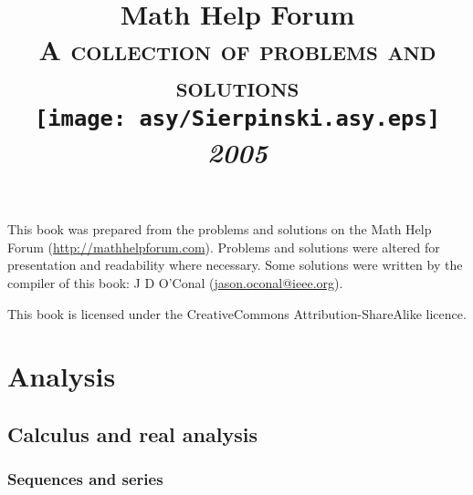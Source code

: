 \documentclass[a4paper,makeidx]{book}
\makeatletter
\renewcommand\tableofcontents{%
    \if@twocolumn
      \@restonecoltrue\onecolumn
    \else
      \@restonecolfalse
    \fi
    \chapter*{\contentsname}%
        \@mkboth{%
           \MakeUppercase\contentsname}{\MakeUppercase\contentsname}%
    \@starttoc{toc}%
    \if@restonecol\twocolumn\fi
    }
\makeatother
\begin{document}
    \title{Math Help Forum\\\vspace{12pt}\Large\textsc{A collection of problems and solutions}\\\vspace{24pt}\texttt{[image: asy/Sierpinski.asy.eps]}\\\vspace{24pt}\Huge\textit{2005}}
	\author{}
    \date{}

    \maketitle

	This book was prepared from the problems and solutions on the Math Help Forum (\url{http://mathhelpforum.com}). Problems and solutions were altered for presentation and readability where necessary. Some solutions were written by the compiler of this book: J D O'Conal (\url{jason.oconal@ieee.org}).

	This book is licensed under the CreativeCommons Attribution-ShareAlike licence.

	\begin{center}\Huge\bysa\normalsize\end{center}

    \tableofcontents




	\part{Analysis}

    \chapter{Calculus and real analysis}

    \section{Sequences and series}
\end{document}
